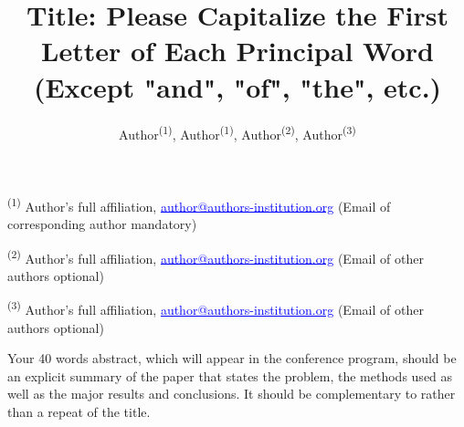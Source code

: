 \documentclass[a4paper, oneside, twocolumn, notitlepage, 10pt]{extarticle_ecoc}
\begin{document}


\title{Title: Please Capitalize the First Letter of Each Principal Word\\(Except "and", "of", "the", etc.)}%


\author{
    Author\textsuperscript{(1)}, Author\textsuperscript{(1)},
    Author\textsuperscript{(2)}, Author\textsuperscript{(3)}
}

\maketitle                  %


\begin{strip}
 \begin{author_descr}

   \textsuperscript{(1)} Author's full affiliation,
   \textcolor{blue}{\uline{author@authors-institution.org}} (Email of corresponding author mandatory)

   \textsuperscript{(2)} Author's full affiliation,
   \textcolor{blue}{\uline{author@authors-institution.org}} (Email of other authors optional)

   \textsuperscript{(3)} Author's full affiliation,
   \textcolor{blue}{\uline{author@authors-institution.org}} (Email of other authors optional)

 \end{author_descr}
\end{strip}



\begin{strip}
  \begin{ecoc_abstract}
    Your 40 words abstract, which will appear in the conference program, should be an explicit summary of the paper that states the problem, the methods used as well as the major results and conclusions. It should be complementary to rather than a repeat of the title.
  \end{ecoc_abstract}
\end{strip}
\end{document}
